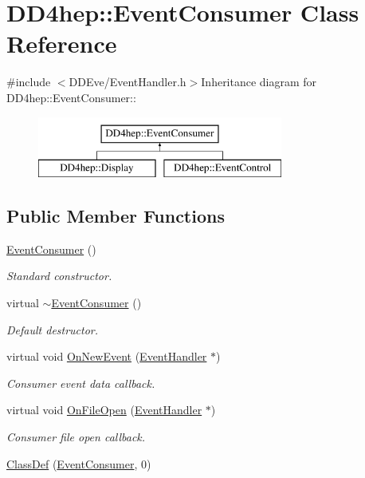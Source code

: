 \hypertarget{class_d_d4hep_1_1_event_consumer}{
\section{DD4hep::EventConsumer Class Reference}
\label{class_d_d4hep_1_1_event_consumer}
}


{\ttfamily \#include $<$DDEve/EventHandler.h$>$}Inheritance diagram for DD4hep::EventConsumer::\begin{figure}[H]
\begin{center}
\leavevmode
\includegraphics[height=2cm]{class_d_d4hep_1_1_event_consumer}
\end{center}
\end{figure}
\subsection*{Public Member Functions}
\begin{DoxyCompactItemize}
\item 
\hyperlink{class_d_d4hep_1_1_event_consumer_a6d0402e70c6479da0fc45e0dee5d050d}{EventConsumer} ()
\begin{DoxyCompactList}\small\item\em Standard constructor. \item\end{DoxyCompactList}\item 
virtual \hyperlink{class_d_d4hep_1_1_event_consumer_aa78ac766120d4cbe9e92dc18af5111c8}{$\sim$EventConsumer} ()
\begin{DoxyCompactList}\small\item\em Default destructor. \item\end{DoxyCompactList}\item 
virtual void \hyperlink{class_d_d4hep_1_1_event_consumer_a755b12d11f8676c4f2957f6a1f26fb31}{OnNewEvent} (\hyperlink{class_d_d4hep_1_1_event_handler}{EventHandler} $\ast$)
\begin{DoxyCompactList}\small\item\em Consumer event data callback. \item\end{DoxyCompactList}\item 
virtual void \hyperlink{class_d_d4hep_1_1_event_consumer_a0a1c56dd7a70e28812fb68c9144ef2fa}{OnFileOpen} (\hyperlink{class_d_d4hep_1_1_event_handler}{EventHandler} $\ast$)
\begin{DoxyCompactList}\small\item\em Consumer file open callback. \item\end{DoxyCompactList}\item 
\hyperlink{class_d_d4hep_1_1_event_consumer_a659e7fffc8eb8674af560b124f2a648d}{ClassDef} (\hyperlink{class_d_d4hep_1_1_event_consumer}{EventConsumer}, 0)
\end{DoxyCompactItemize}



